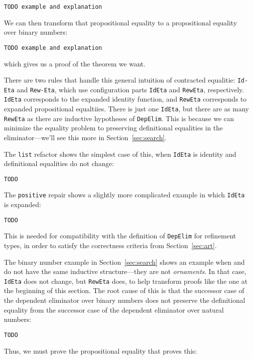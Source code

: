 \begin{lstlisting}
TODO example and explanation
\end{lstlisting}
We can then transform that propositional equality to a propositional equality over binary numbers:

\begin{lstlisting}
TODO example and explanation
\end{lstlisting}
which gives us a proof of the theorem we want.

There are two rules that handle this general intuition of contracted equalitie:
\lstinline{Id-Eta} and \lstinline{Rew-Eta}, which use configuration parts
\lstinline{IdEta} and \lstinline{RewEta}, respectively.
\lstinline{IdEta} corresponds to the expanded identity function, and \lstinline{RewEta}
corresponds to expanded propositional equaltiies.
There is just one \lstinline{IdEta}, but there are as many \lstinline{RewEta} as there are
inductive hypotheses of \lstinline{DepElim}.
This is because we can minimize the equality problem to preserving definitional equalities
in the eliminator---we'll see this more in Section~\ref{sec:search}.

The \lstinline{list} refactor shows the simplest case of this, when \lstinline{IdEta} is identity
and definitional equalities do not change:

\begin{lstlisting}
TODO
\end{lstlisting}
The \lstinline{positive} repair shows a slightly more complicated example in which \lstinline{IdEta} is expanded:

\begin{lstlisting}
TODO
\end{lstlisting}
This is needed for compatibility with the definition of \lstinline{DepElim} for refinement types,
in order to satisfy the correctness criteria from Section~\ref{sec:art}.

The binary number example in Section~\ref{sec:search} shows an example when \A and \B do not have the same inductive
structure---they are not \textit{ornaments}. %
In that case, \lstinline{IdEta} does not change, but \lstinline{RewEta} does, to help transform proofs
like the one at the beginning of this section.
The root cause of this is that the successor case of the dependent eliminator over binary numbers does not preserve
the definitional equality from the successor case of the dependent eliminator over natural numbers:

\begin{lstlisting}
TODO
\end{lstlisting}
Thus, we must prove the propositional equality that proves this:

